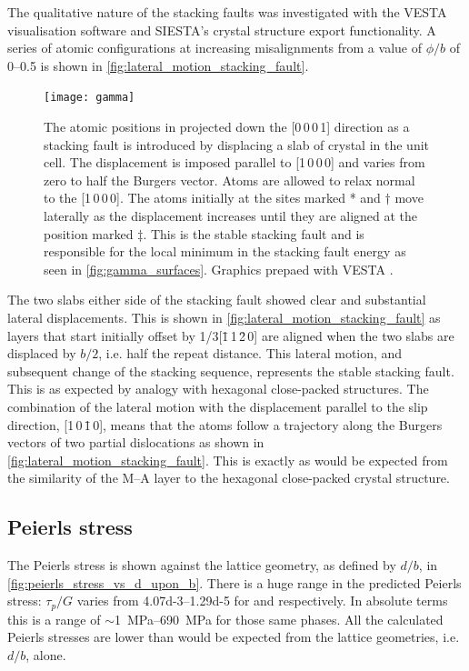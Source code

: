 The qualitative nature of the stacking faults was investigated with the VESTA visualisation software and SIESTA's crystal structure export functionality. A series of atomic configurations at increasing misalignments from a value of $\phi/b$ of \numrange{0}{0.5} is shown in \autoref{fig:lateral_motion_stacking_fault}.


\begin{figure}[!ht]
\centering
\texttt{[image: gamma]}
\captionsetup{width=0.9\textwidth}
\caption[Atomic configurations around stacking faults.]{The atomic positions in  projected down the [0\,0\,0\,1] direction as a stacking fault is introduced by displacing a slab of crystal in the unit cell. The displacement is imposed  parallel to [1\,0\,0\,0] and varies from zero to half the Burgers vector. Atoms are allowed to relax normal to the [1\,0\,0\,0]. The atoms initially at the sites marked * and $\dagger$ move laterally as the displacement increases until they are aligned at the position marked $\ddagger$. This is the stable stacking fault and is responsible for the local minimum in the stacking fault energy as seen in \autoref{fig:gamma_surfaces}. Graphics prepaed with VESTA \cite{Momma2011}.\label{fig:lateral_motion_stacking_fault}}
\end{figure}




The two slabs either side of the stacking fault showed clear and substantial lateral displacements. This is shown in \autoref{fig:lateral_motion_stacking_fault} as layers that start initially offset by 1/3[\={1}\,1\,\=2\,0] are aligned when the two slabs are displaced by $b/2$, i.e. half the repeat distance. This lateral motion, and subsequent change of the stacking sequence, represents the stable stacking fault. This is as expected by analogy with hexagonal close-packed structures. The combination of the lateral motion with the displacement parallel to the slip direction, [1\,0\,\={1}\,0], means that the atoms follow a trajectory along the Burgers vectors of two partial dislocations as shown in \autoref{fig:lateral_motion_stacking_fault}. This is exactly as would be expected from the similarity of the M--A layer to the hexagonal close-packed crystal structure. 


\subsection{Peierls stress}

The Peierls stress is shown against the lattice geometry, as defined by $d/b$, in \autoref{fig:peierls_stress_vs_d_upon_b}. There is a huge range in the predicted Peierls stress: $\tau_p / G$ varies from \numrange{4.07d-3}{1.29d-5} for  and  respectively. In absolute terms this is a range of $\sim$\SIrange{1}{690}{\mega\pascal} for those same phases. All the calculated Peierls stresses are lower than would be expected from the lattice geometries, i.e. $d/b$, alone.



